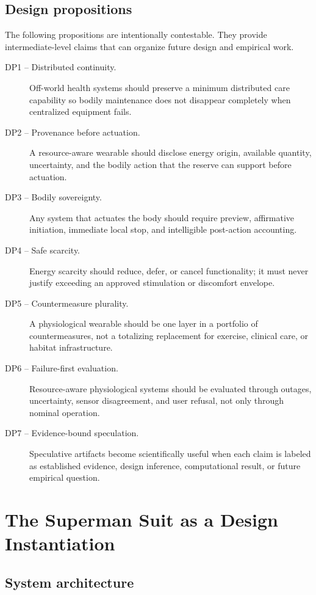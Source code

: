 \documentclass[runningheads]{llncs}
\begin{document}
\subsection{Design propositions}

The following propositions are intentionally contestable. They provide intermediate-level claims that can organize future design and empirical work.

\begin{description}
\item[DP1 -- Distributed continuity.] Off-world health systems should preserve a minimum distributed care capability so bodily maintenance does not disappear completely when centralized equipment fails.
\item[DP2 -- Provenance before actuation.] A resource-aware wearable should disclose energy origin, available quantity, uncertainty, and the bodily action that the reserve can support before actuation.
\item[DP3 -- Bodily sovereignty.] Any system that actuates the body should require preview, affirmative initiation, immediate local stop, and intelligible post-action accounting.
\item[DP4 -- Safe scarcity.] Energy scarcity should reduce, defer, or cancel functionality; it must never justify exceeding an approved stimulation or discomfort envelope.
\item[DP5 -- Countermeasure plurality.] A physiological wearable should be one layer in a portfolio of countermeasures, not a totalizing replacement for exercise, clinical care, or habitat infrastructure.
\item[DP6 -- Failure-first evaluation.] Resource-aware physiological systems should be evaluated through outages, uncertainty, sensor disagreement, and user refusal, not only through nominal operation.
\item[DP7 -- Evidence-bound speculation.] Speculative artifacts become scientifically useful when each claim is labeled as established evidence, design inference, computational result, or future empirical question.
\end{description}

\section{The Superman Suit as a Design Instantiation}

\subsection{System architecture}
\end{document}

